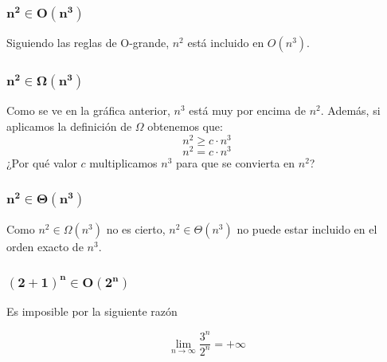 \documentclass[10pt,a4paper,spanish]{report}
\theoremstyle{definition}
\theoremstyle{remark}
\begin{document}
\begin{multicols}{2}
\subsubsection{$\mathbf{n^2 \in O(n^3)}$}


Siguiendo las reglas de O-grande, $n^2$ está incluido en $O(n^3)$.


\subsubsection{$\mathbf{n^2 \in \Omega(n^3)}$}

Como se ve en la gráfica anterior, $n^3$ está muy por encima de $n^2$. Además, si aplicamos la definición de $\Omega$ obtenemos que:
\begin{displaymath}
n^2 \geq c \cdot n^3
\end{displaymath}
\begin{displaymath}
n^2 = c \cdot n^3
\end{displaymath}
¿Por qué valor $c$ multiplicamos $n^3$ para que se convierta en $n^2$?

\subsubsection{$\mathbf{n^2 \in \Theta(n^3)}$}


Como $n^2 \in \Omega(n^3)$ no es cierto, $n^2 \in \Theta(n^3)$ no puede estar incluido en el orden exacto de $n^3$.

\subsubsection{$\mathbf{(2 + 1)^n \in O(2^n)}$}
\label{apartado9}


Es imposible por la siguiente razón

\begin{displaymath}
\lim_{n \rightarrow \infty} \frac{3^n}{2^n} = +\infty
\end{displaymath}


\end{multicols}
\end{document}
